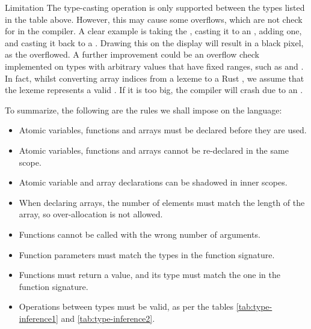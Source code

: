 \begin{warningbox}{Limitation}
    The type-casting operation is only supported
    between the types listed in the table above. However, this may cause some
    overflows, which are not check for in the compiler. A clear example is taking
    the  , casting it to an , adding one, and casting it back to a . Drawing this on the display will result in a black pixel, as the  overflowed.
    A further improvement could be an overflow check implemented on types with arbitrary values that have fixed ranges, such as  and .
    In fact, whilst converting array indices from a lexeme to a Rust , we assume that the lexeme represents a valid . If it is too big, the compiler will crash due to an .
\end{warningbox}

To summarize, the following are the rules we shall impose on the language:

\begin{itemize}
    \item Atomic variables, functions and arrays must be declared before they are used.
    \item Atomic variables, functions and arrays cannot be re-declared in the same scope.
    \item Atomic variable and array declarations can be shadowed in inner scopes.
    \item When declaring arrays, the number of elements must match the length of
          the array, so over-allocation is not allowed.
    \item Functions cannot be called with the wrong number of arguments.
    \item Function parameters must match the types in the function signature.
    \item Functions must return a value, and its type must match the one in the function signature.
    \item Operations between types must be valid, as per the tables \ref{tab:type-inference1} and \ref{tab:type-inference2}.
\end{itemize}
